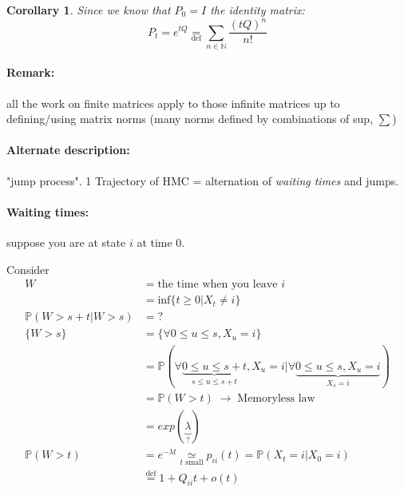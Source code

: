 \documentclass{article}
\newtheorem{coro}{Corollary}
\begin{document}
\begin{coro}
Since we know that $P_0 = I$ the identity matrix:
\[P_t = e^{tQ} \underset{\text{def}}{=} \sum_{n\in \mathbb{N}} \frac{(tQ)^n}{n!}\]
\end{coro}

\paragraph{Remark:} all the work on finite matrices apply to those infinite matrices up to defining/using matrix norms (many norms defined by combinations of sup, $\sum$)




\paragraph{Alternate description:} "jump process".
1 Trajectory of HMC = alternation of \emph{waiting times} and jumps.

\paragraph{Waiting times:} suppose you are at state $i$ at time 0.


Consider
\begin{align*}
W & = \text{the time when you leave $i$}\\
& = \text{inf} \{ t \geq 0 | X_t\neq i\}\\
\mathbb{P}(W>s+t|W>s) & = ?\\
\{W > s \} &= \{ \forall 0\leq u \leq s, X_u=i\}\\
& = \mathbb{P}( \forall \underbrace{0\leq u \leq s+t}_{s\leq u \leq s+t}, X_u=i | \forall \underbrace{0\leq u \leq s, X_u = i}_{X_s=i})\\
& = \mathbb{P}(W>t) \; \to \; \text{Memoryless law}\\
& = exp(\underbrace{\lambda}_?)\\
\mathbb{P}(W>t) & = e^{-\lambda t} \underset{t \text{ small}}{\simeq} p_{ii}(t) = \mathbb{P}(X_t=i|X_0=i)\\
& \overset{\text{def}}{=} 1 + Q_{ii}t + o(t)
\end{align*}
\end{document}
